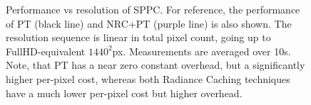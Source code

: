 \begin{figure}
    \centering
    
    \caption{Performance vs resolution of SPPC. For reference, the performance of PT (black line) and NRC+PT (purple line) is also shown. The resolution sequence is linear in total pixel count, going up to FullHD-equivalent $1440^2$px. Measurements are averaged over 10s. Note, that PT has a near zero constant overhead, but a significantly higher per-pixel cost, whereas both Radiance Caching techniques have a much lower per-pixel cost but higher overhead.}
    \label{fig:perres}
\end{figure}